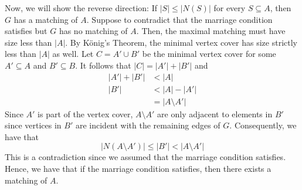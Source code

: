 \begin{solution}
  Now, we will show the reverse direction: If \(|S| \leq |N(S)|\) for every \(S
  \subseteq A\), then \(G\) has a matching of \(A\). Suppose to contradict that
  the marriage condition satisfies but \(G\) has no matching of \(A\). Then, the
  maximal matching must have size less than \(|A|\). By K\"onig's Theorem, the
  minimal vertex cover has size strictly less than \(|A|\) as well. Let \(C = A'
  \cup B'\) be the minimal vertex cover for some \(A' \subseteq A\) and \(B'
  \subseteq B\). It follows that \(|C| = |A'| + |B'|\) and
  \[
    \begin{aligned}
      |A'| + |B'| &< |A| \\
      |B'| &< |A| - |A'| \\
           &= |A \setminus A'|
    \end{aligned}
  \]
  Since \(A'\) is part of the vertex cover, \(A \setminus A'\) are only adjacent
  to elements in \(B'\) since vertices in \(B'\) are incident with the remaining
  edges of \(G\). Consequently, we have that
  \[ |N(A \setminus A')| \leq |B'| < |A \setminus A'| \]
  This is a contradiction since we assumed that the marriage condition satisfies.
  Hence, we have that if the marriage condition satisfies, then there exists a
  matching of \(A\). 
\end{solution}
